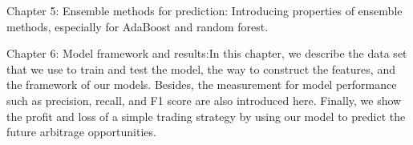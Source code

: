 Chapter 5: Ensemble methods for prediction:  Introducing properties of ensemble methods, especially for AdaBoost and random forest. 

Chapter 6: Model framework and results:In this chapter, we describe the data set that we use to train and test the model,  the way to construct the features,  and the framework of our models. Besides,  the measurement for model performance such as precision,  recall,  and F1 score are also introduced here. Finally,  we show the profit and loss of a simple trading strategy by using our model to predict the future arbitrage opportunities.

